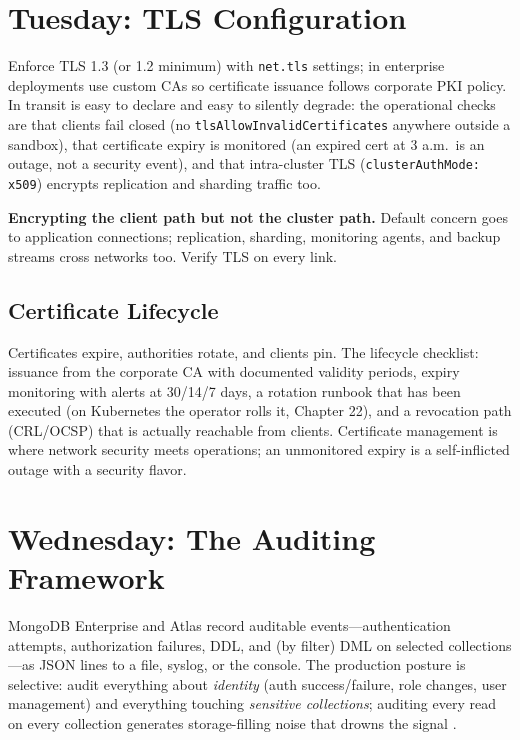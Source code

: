 \section{Tuesday: TLS Configuration}
Enforce TLS 1.3 (or 1.2 minimum) with \texttt{net.tls} settings; in enterprise deployments use custom CAs so certificate issuance follows corporate PKI policy. In transit is easy to declare and easy to silently degrade: the operational checks are that clients fail closed (no \texttt{tlsAllowInvalidCertificates} anywhere outside a sandbox), that certificate expiry is monitored (an expired cert at 3 a.m.\ is an outage, not a security event), and that intra-cluster TLS (\texttt{clusterAuthMode: x509}) encrypts replication and sharding traffic too.

\begin{pitfall}
\textbf{Encrypting the client path but not the cluster path.} Default concern goes to application connections; replication, sharding, monitoring agents, and backup streams cross networks too. Verify TLS on every link.
\end{pitfall}

\subsection{Certificate Lifecycle}
Certificates expire, authorities rotate, and clients pin. The lifecycle checklist: issuance from the corporate CA with documented validity periods, expiry monitoring with alerts at 30/14/7 days, a rotation runbook that has been executed (on Kubernetes the operator rolls it, Chapter 22), and a revocation path (CRL/OCSP) that is actually reachable from clients. Certificate management is where network security meets operations; an unmonitored expiry is a self-inflicted outage with a security flavor.

\section{Wednesday: The Auditing Framework}
MongoDB Enterprise and Atlas record auditable events---authentication attempts, authorization failures, DDL, and (by filter) DML on selected collections---as JSON lines to a file, syslog, or the console. The production posture is selective: audit everything about \emph{identity} (auth success/failure, role changes, user management) and everything touching \emph{sensitive collections}; auditing every read on every collection generates storage-filling noise that drowns the signal \cite{mongodbAuditingDocs}.


